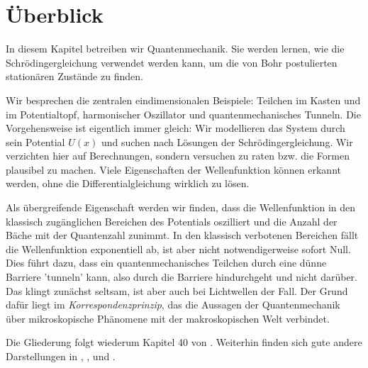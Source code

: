 


\section{Überblick}

In diesem Kapitel betreiben wir Quantenmechanik. Sie werden lernen, wie die Schrödingergleichung verwendet werden kann, um die von Bohr postulierten stationären Zustände zu finden.

Wir besprechen die zentralen eindimensionalen Beispiele: Teilchen im Kasten und im Potentialtopf, harmonischer Oszillator und quantenmechanisches Tunneln. Die Vorgehensweise ist eigentlich immer gleich: Wir modellieren das System durch sein Potential $U(x)$ und suchen nach Lösungen der Schrödingergleichung. Wir verzichten hier auf Berechnungen, sondern versuchen zu raten bzw. die Formen plausibel zu machen. Viele Eigenschaften der Wellenfunktion können erkannt werden, ohne die Differentialgleichung wirklich zu lösen.

Als übergreifende Eigenschaft werden wir finden, dass die Wellenfunktion in den klassisch zugänglichen Bereichen des Potentials oszilliert und die Anzahl der Bäche mit der Quantenzahl zunimmt. In den klassisch verbotenen Bereichen fällt die Wellenfunktion exponentiell ab, ist aber nicht notwendigerweise sofort Null. Dies führt dazu, dass ein quantenmechanisches Teilchen durch eine dünne Barriere 'tunneln' kann, also durch die Barriere hindurchgeht und nicht darüber. Das klingt zunächst seltsam, ist aber auch bei Lichtwellen der Fall. Der Grund dafür liegt im \emph{Korrespondenzprinzip}, das die Aussagen der Quantenmechanik über mikroskopische Phänomene mit der makroskopischen Welt verbindet.

Die Gliederung folgt wiederum  Kapitel 40 von \cite{Knight_physics}. Weiterhin finden sich gute andere Darstellungen in \cite{Haliday_Resnick}, \cite{Demtröder_ep3}, \cite{Haken_wolf_I} und \cite{Harris_moderne_Physik}.




